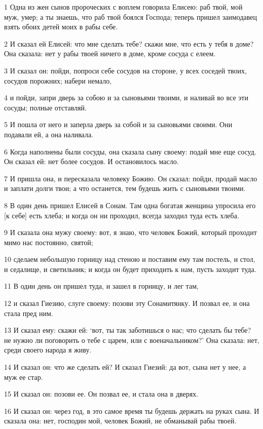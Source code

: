 \par 1 Одна из жен сынов пророческих с воплем говорила Елисею: раб твой, мой муж, умер; а ты знаешь, что раб твой боялся Господа; теперь пришел заимодавец взять обоих детей моих в рабы себе.
\par 2 И сказал ей Елисей: что мне сделать тебе? скажи мне, что есть у тебя в доме? Она сказала: нет у рабы твоей ничего в доме, кроме сосуда с елеем.
\par 3 И сказал он: пойди, попроси себе сосудов на стороне, у всех соседей твоих, сосудов порожних; набери немало,
\par 4 и пойди, запри дверь за собою и за сыновьями твоими, и наливай во все эти сосуды; полные отставляй.
\par 5 И пошла от него и заперла дверь за собой и за сыновьями своими. Они подавали ей, а она наливала.
\par 6 Когда наполнены были сосуды, она сказала сыну своему: подай мне еще сосуд. Он сказал ей: нет более сосудов. И остановилось масло.
\par 7 И пришла она, и пересказала человеку Божию. Он сказал: пойди, продай масло и заплати долги твои; а что останется, тем будешь жить с сыновьями твоими.
\par 8 В один день пришел Елисей в Сонам. Там одна богатая женщина упросила его [к себе] есть хлеба; и когда он ни проходил, всегда заходил туда есть хлеба.
\par 9 И сказала она мужу своему: вот, я знаю, что человек Божий, который проходит мимо нас постоянно, святой;
\par 10 сделаем небольшую горницу над стеною и поставим ему там постель, и стол, и седалище, и светильник; и когда он будет приходить к нам, пусть заходит туда.
\par 11 В один день он пришел туда, и зашел в горницу, и лег там,
\par 12 и сказал Гиезию, слуге своему: позови эту Сонамитянку. И позвал ее, и она стала пред ним.
\par 13 И сказал ему: скажи ей: `вот, ты так заботишься о нас; что сделать бы тебе? не нужно ли поговорить о тебе с царем, или с военачальником?' Она сказала: нет, среди своего народа я живу.
\par 14 И сказал он: что же сделать ей? И сказал Гиезий: да вот, сына нет у нее, а муж ее стар.
\par 15 И сказал он: позови ее. Он позвал ее, и стала она в дверях.
\par 16 И сказал он: через год, в это самое время ты будешь держать на руках сына. И сказала она: нет, господин мой, человек Божий, не обманывай рабы твоей.
